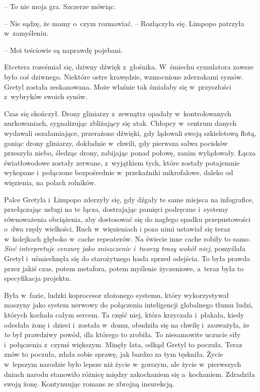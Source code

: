 \documentclass[oneside,polish,11pt,sfheadings]{mwbk}
\begin{document}
-- To nie moja gra. Szczerze mówiąc.

-- Nie sądzę, że mamy o~czym rozmawiać. -- Rozłączyła się. Limpopo
patrzyła w~zamyśleniu.

-- Moi teściowie są naprawdę pojebani.

Etcetera roześmiał się, dziwny dźwięk z~głośnika. W~śmiechu symulatora
zawsze było coś dziwnego. Niektóre ostre krawędzie, wzmocnione
zderzakami symów. Gretyl została zeskanowana. Może właśnie tak śmiałaby
się w~przyszłości z~wybryków swoich synów.

Czas się skończył. Drony gliniarzy z~zewnątrz opadały w~kontrolowanych
nurkowaniach, sygnalizując zbliżający się atak. Chłopcy w~centrum danych
wydawali oszałamiające, przerażone dźwięki, gdy lądowali swoją
szkieletową flotą, goniąc drony gliniarzy, dokładnie w~chwili, gdy
pierwsza salwa pocisków przeszyła niebo, śledząc drony, zabijając ponad
połowę, zanim wylądowały. Łącza światłowodowe zostały zerwane, z~wyjątkiem tych, które zostały potajemnie wykopane i~połączone
bezpośrednie w~przekaźniki mikrofalowe, daleko od więzienia, na polach
rolników.

Palce Gretyla i~Limpopo zderzyły się, gdy dźgały te same miejsca na
infografice, przełączając usługi na te łącza, dostrajając pamięci
podręczne i~systemy równoważenia obciążenia, aby dostosować się do
nagłego spadku przepustowości o~dwa rzędy wielkości. Ruch w~więzieniach
i poza nimi ustawiał się teraz w~kolejkach głęboko w~cache repeaterów.
Na świecie inne cache robiły to samo. \textit{Sieć interpretuje cenzurę
jako zniszczenie i~tworzy trasy wokół niej}, pomyślała Gretyl i~uśmiechnęła się do starożytnego hasła sprzed odejścia. To była prawda
przez jakiś czas, potem metafora, potem myślenie życzeniowe, a~teraz
była to specyfikacja projektu.

Była w~fazie, ludzki koprocesor złożonego systemu, który wykorzystywał
maszyny jako system nerwowy do połączenia inteligencji globalnego tłumu
ludzi, których kochała całym sercem. Ta część niej, która krzyczała i~płakała, kiedy odesłała żonę i~dzieci i~została w~domu, obudziła się na
chwilę i~zauważyła, że \textit{to} był prawdziwy powód, dla którego to
zrobiła. To niesamowite uczucie siły i~połączenia z~czymś większym.
Minęły lata, odkąd Gretyl to poczuła. Teraz znów to poczuła, zdała sobie
sprawę, jak bardzo za tym tęskniła. Życie w~lepszym narodzie było lepsze
niż życie w~gorszym, ale życie w~pierwszych dniach narodu stanowiło
różnicę między zakochaniem się a~kochaniem. Zdradziła swoją żonę.
Kontynuując romans ze zbrojną insurekcją.
\end{document}
